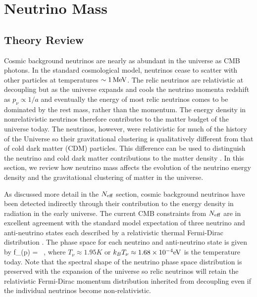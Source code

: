 \section{Neutrino Mass}

\subsection{Theory Review}

Cosmic background neutrinos are nearly as abundant in the universe as CMB photons. In the standard cosmological model, neutrinos cease to scatter with other particles at temperatures $\sim 1 \, {\rm MeV}$. The relic neutrinos are relativistic at decoupling but as the universe expands and cools the neutrino momenta redshift as $p_\nu\propto 1/a$ and eventually the energy of most relic neutrinos comes to be dominated by the rest mass, rather than the momentum. The energy density in nonrelativistic neutrinos therefore contributes to the matter budget of the universe today. The neutrinos, however, were relativistic for much of the history of the Universe so their gravitational clustering is qualitatively different from that of cold dark matter (CDM) particles. This difference can be used to distinguish the neutrino and cold dark matter contributions to the matter density \cite{Hu:1997mj, Lesgourgues:2006nd, Abazajian:2011dt}.  In this section, we review how neutrino mass affects the evolution of the neutrino energy density and the gravitational clustering of matter in the universe. 
 
As discussed more detail in the $N_{\rm eff}$ section, cosmic background neutrinos have been detected indirectly through their contribution to the energy density in radiation in the early universe. The current CMB constraints from $N_{\rm eff}$ are in excellent agreement with the standard model expectation of three neutrino and anti-neutrino states each described by a relativistic thermal Fermi-Dirac distribution \cite{Ade:2015xua}. The phase space for each neutrino and anti-neutrino state is given by
\beq
f_\nu(p) =  \ ,
\eeq
where $T_{\nu} \approx 1.95K$ or $k_B T_{\nu} \approx 1.68 \times 10^{-4}{\rm eV}$ is the temperature today. Note that the spectral shape of the neutrino phase space distribution is preserved with the expansion of the universe so relic neutrinos will retain the relativistic Fermi-Dirac momentum distribution inherited from decoupling even if the individual neutrinos become non-relativistic. 

